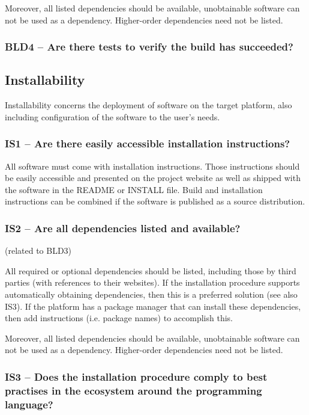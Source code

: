 \documentclass[a4paper,11pt]{article}
\begin{document}
Moreover, all listed dependencies should be available, unobtainable software
can not be used as a dependency. Higher-order dependencies need not be listed.

\subsubsection{BLD4 -- Are there tests to verify the build has succeeded?}


\subsection{Installability}

Installability concerns the deployment of software on the target platform, also
including configuration of the software to the user's needs.

\subsubsection{IS1 -- Are there easily accessible installation instructions?}

All software must come with installation instructions. Those instructions should
be easily accessible and presented on the project website as well as shipped
with the software in the README or INSTALL file. Build and installation
instructions can be combined if the software is published as a source
distribution.

\subsubsection{IS2 -- Are all dependencies listed and available?}
(related to BLD3)

All required or optional dependencies should be listed, including those by
third parties (with references to their websites). If the installation
procedure supports automatically obtaining dependencies, then this is a
preferred solution (see also IS3). If the platform has a package manager that
can install these dependencies, then add instructions (i.e. package names) to
accomplish this.

Moreover, all listed dependencies should be available, unobtainable software
can not be used as a dependency. Higher-order dependencies need not be listed.

\subsubsection{IS3 -- Does the installation procedure comply to best practises
in the ecosystem around the programming language?}
\end{document}
